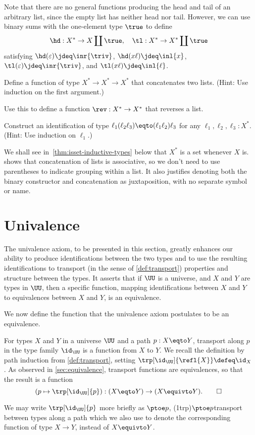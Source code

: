 Note that there are no general functions producing the
head and tail of an arbitrary list, since the empty list
has neither head nor tail.
However, we can use binary sums with the one-element type $\true$
to define
\[
  \hd : X^* \to X \coprod\true, \quad
  \tl : X^* \to X^* \coprod\true
\]
satisfying $\hd(\varepsilon) \jdeq \inr{\triv}$,
$\hd(x\ell) \jdeq \inl{x}$,
$\tl(\varepsilon) \jdeq\inr{\triv}$,
and $\tl(x\ell) \jdeq \inl{\ell}$.

\begin{xca}\label{xca:reverse}
  Define a function of type $X^* \to X^* \to X^*$ that
  concatenates two lists. (Hint: Use induction on the first argument.)

  Use this to define a function $\rev: X^* \to X^*$ that reverses a list.
\end{xca}

\begin{xca}\label{xca:concat-assoc}
  Construct an identification of type
  $\ell_1(\ell_2\ell_3) \eqto (\ell_1\ell_2)\ell_3$
  for any $\ell_1,\ell_2,\ell_3 : X^*$. (Hint: Use induction on $\ell_1$.)
\end{xca}

We shall see in~\cref{thm:isset-inductive-types} below
that $X^*$ is a set whenever $X$ is.
 shows that concatenation of lists
is associative, so we don't need to use parentheses to indicate grouping
within a list. It also justifies denoting both the binary constructor and
concatenation as juxtaposition, with no separate symbol or name.

\section{Univalence}\label{sec:univax}

The univalence axiom, to be presented in this section, greatly enhances
our ability to produce identifications between the two types and to use the
resulting identifications to transport (in the sense of \cref{def:transport})
properties and structure between the types.  It asserts that if $\UU$
is a universe, and $X$ and $Y$ are types in $\UU$, then a specific function,
mapping identifications between $X$ and $Y$ to equivalences between
$X$ and $Y$, is an equivalence.

We now define the function that the univalence axiom postulates
to be an equivalence.

\begin{definition}\label{def:idtoeq}
  For types $X$ and $Y$ in a universe $\UU$ and a path $p : X \eqto Y$,
  transport along $p$ in the type family $\id_\UU$ is a function
  from $X$ to $Y$. We recall the definition by path induction
  from \cref{def:transport}, setting $\trp[\id_\UU]{\refl{X}}\defeq\id_X$.
  As observed in \cref{sec:equivalence}, transport functions are
  equivalences, so that the result is a function
  \[
    (p\mapsto \trp[\id_\UU]{p}) : (X \eqto Y) \to (X\equivto Y).
    \qedhere
  \]
\end{definition}
We may write $\trp[\id_\UU]{p}$ more briefly as $\ptoe p$,%
\glossary(1trp){$\protect\ptoe p$}{transport between types along a path}
which we also use to denote the corresponding function of type $X\to Y$,
instead of $X\equivto Y$.

